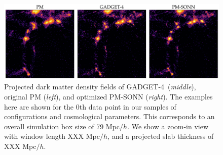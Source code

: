 \documentclass[modern, trackchanges, dvipsnames]{aastex631}
\newcommand{\GADGET}{{{\fontsize{10pt}{12pt}\selectfont GADGET}-4}}
\begin{document}
\begin{figure}
  \centering
  \includegraphics[width=.98\columnwidth]{slab_s0_snap120_3177874_e3000.pdf}
  \caption{Projected dark matter density fields of \GADGET\
  (\textit{middle}), original PM (\textit{left}), and optimized PM-SONN
  (\textit{right}).
  The examples here are shown for the 0th data point in our samples of
  configurations and cosmological parameters.
  This corresponds to an overall simulation box size of 79 Mpc$/h$.
  We show a zoom-in view with window length XXX Mpc$/h$, and a projected
  slab thickness of XXX Mpc$/h$.}
  \label{fig:denslab}
\end{figure}
\end{document}
